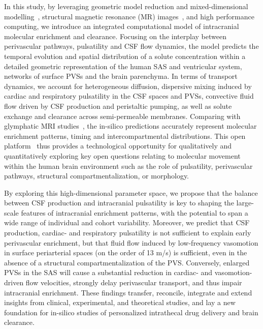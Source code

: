 \documentclass[fleqn,10pt]{wlscirep}
\begin{document}
In this study, by leveraging geometric model reduction and
mixed-dimensional modelling~\cite{masri2024modelling}, structural
magnetic resonance (MR) images~\cite{hodneland2019new}, and high
performance computing, we introduce an integrated computational model
of intracranial molecular enrichment and clearance. Focusing on the
interplay between perivascular pathways, pulsatility and CSF flow
dynamics, the model predicts the temporal evolution and spatial
distribution of a solute concentration within a detailed geometric
representation of the human SAS and ventricular system, networks of
surface PVSs and the brain parenchyma. In terms of transport dynamics,
we account for heterogeneous diffusion, dispersive mixing induced by
cardiac and respiratory pulsatility in the CSF spaces and PVSs,
convective fluid flow driven by CSF production and peristaltic
pumping, as well as solute exchange and clearance across
semi-permeable membranes. Comparing with glymphatic MRI
studies~\cite{ringstad2017glymphatic, ringstad2018brain,
  watts2019measuring}, the in-silico predictions accurately represent
molecular enrichment patterns, timing and intercompartmental
distributions. This open platform~\cite{ZENODO} thus provides a
technological opportunity for qualitatively and quantitatively
exploring key open questions relating to molecular movement within the
human brain environment such as the role of pulsatility, perivascular
pathways, structural compartmentalization, or morphology.

By exploring this high-dimensional parameter space, we propose that
the balance between CSF production and intracranial pulsatility is key
to shaping the large-scale features of intracranial enrichment
patterns, with the potential to span a wide range of individual and
cohort variability. Moreover, we predict that CSF production, cardiac-
and respiratory pulsatility is not sufficient to explain early
perivascular enrichment, but that fluid flow induced by low-frequency
vasomotion in surface periarterial spaces (on the order of 13 \textmu
m/s) is sufficient, even in the absence of a structural
compartmentalization of the PVS. Conversely, enlarged PVSs in the SAS
will cause a substantial reduction in cardiac- and vasomotion-driven
flow velocities, strongly delay perivascular transport, and thus
impair intracranial enrichment. These findings transfer, reconcile,
integrate and extend insights from clinical, experimental, and
theoretical studies, and lay a new foundation for in-silico studies of
personalized intrathecal drug delivery and brain clearance.
\end{document}
